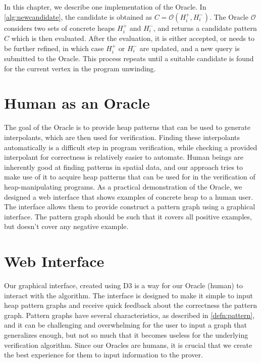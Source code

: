 \label{ch:interface-oracle}

In this chapter, we describe one implementation of the Oracle. In \autoref{alg:newcandidate}, the candidate is obtained as $C = \mathcal{O}(H_i^{+}, H_i^{-})$. The Oracle $\mathcal{O}$ considers two sets of concrete heaps $H_i^{+}$ and $H_i^{-}$, and returns a candidate pattern $C$ which is then evaluated. After the evaluation, it is either accepted, or needs to be further refined, in which case $H_i^{+}$ or $H_i^{-}$ are updated, and a new query is submitted to the Oracle. This process repeats until a suitable candidate is found for the current vertex in the program unwinding.

\section{Human as an Oracle}
The goal of the Oracle is to provide heap patterns that can be used to generate interpolants, which are then used for verification. Finding these interpolants automatically is a difficult step in program verification, while checking a provided interpolant for correctness is relatively easier to automate. Human beings are inherently good at finding patterns in spatial data, and our approach tries to make use of it to acquire heap patterns that can be used for in the verification of heap-manipulating programs. As a practical demonstration of the Oracle, we designed a web interface that shows examples of concrete heap to a human user. The interface allows them to provide construct a pattern graph using a graphical interface. The pattern graph should be such that it covers all positive examples, but doesn't cover any negative example.

\section{Web Interface}
\label{sec:web-interface}
Our graphical interface, created using D3 \cite{d3js} is a way for our Oracle (human) to interact with the \verifier algorithm. The interface is designed to make it simple to input heap pattern graphs and receive quick feedback about the correctness the pattern graph. Pattern graphs have several characteristics, as described in \autoref{defn:pattern}, and it can be challenging and overwhelming for the user to input a graph that generalizes enough, but not so much that it becomes useless for the underlying verification algorithm. Since our Oracles are humans, it is crucial that we create the best experience for them to input information to the prover.

